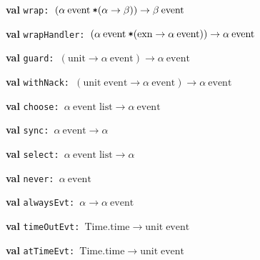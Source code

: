 \begin{interface}
\item {}{\textbf{val}} {\tt wrap: \((\alpha\:\mathrm{event}\:\verb,*,(\alpha\rightarrow \beta))\rightarrow \beta\:\mathrm{event}\)}

\item {}{\textbf{val}} {\tt wrapHandler: \((\alpha\:\mathrm{event}\:\verb,*,(\mathrm{exn}\rightarrow \alpha\:\mathrm{event}))\rightarrow \alpha\:\mathrm{event}\)}

\item {}{\textbf{val}} {\tt guard: \((\mathrm{unit}\rightarrow \alpha\:\mathrm{event})\rightarrow \alpha\:\mathrm{event}\)}

\item {}{\textbf{val}} {\tt withNack: \((\mathrm{unit}\;\mathrm{event}\rightarrow \alpha\:\mathrm{event})\rightarrow \alpha\:\mathrm{event}\)}

\item {}{\textbf{val}} {\tt choose: \(\alpha\:\mathrm{event}\;\mathrm{list}\rightarrow \alpha\:\mathrm{event}\)}

\item {}{\textbf{val}} {\tt sync: \(\alpha\:\mathrm{event}\rightarrow \alpha\)}

\item {}{\textbf{val}} {\tt select: \(\alpha\:\mathrm{event}\;\mathrm{list}\rightarrow \alpha\)}

\item {}{\textbf{val}} {\tt never: \(\alpha\:\mathrm{event}\)}

\item {}{\textbf{val}} {\tt alwaysEvt: \(\alpha\rightarrow \alpha\:\mathrm{event}\)}

\item {}{\textbf{val}} {\tt timeOutEvt: \(\mathrm{Time}.\mathrm{time}\rightarrow \mathrm{unit}\;\mathrm{event}\)}

\item {}{\textbf{val}} {\tt atTimeEvt: \(\mathrm{Time}.\mathrm{time}\rightarrow \mathrm{unit}\;\mathrm{event}\)}

\end{interface}

